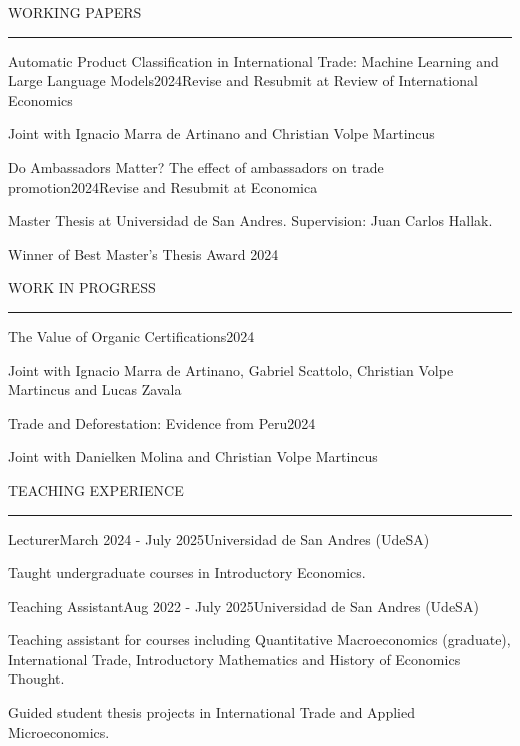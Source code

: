 \documentclass{resume} %
\renewenvironment{rSection}[1]{
\sectionskip
\textcolor{CustomRed}{\MakeUppercase{#1}}
\sectionlineskip
\hrule
\begin{list}{}{
\setlength{\leftmargin}{1.5em}
}
\item[]
}{
\end{list}
}
\begin{document}
\vspace{-0.3cm}
\begin{rSection}{Working Papers}
\begin{rSubsection}{Automatic Product Classification in International Trade: Machine Learning and Large Language Models}{2024}{Revise and Resubmit at Review of International Economics}{}
\item{Joint with Ignacio Marra de Artinano and Christian Volpe Martincus}
\end{rSubsection}

\begin{rSubsection}{Do Ambassadors Matter? The effect of ambassadors on trade promotion}{2024}{Revise and Resubmit at Economica}{}
\item{Master Thesis at Universidad de San Andres. Supervision: Juan Carlos Hallak.}
\item{Winner of Best Master's Thesis Award 2024}
\end{rSubsection}
\end{rSection}

\vspace{-0.3cm}
\begin{rSection}{Work in Progress}
\begin{rSubsection}{The Value of Organic Certifications}{2024}{}{}
\item{Joint with Ignacio Marra de Artinano, Gabriel Scattolo, Christian Volpe Martincus and Lucas Zavala}
\end{rSubsection}

\begin{rSubsection}{Trade and Deforestation: Evidence from Peru}{2024}{}{}
\item{Joint with Danielken Molina and Christian Volpe Martincus}
\end{rSubsection}
\end{rSection}

\vspace{-0.3cm}
\begin{rSection}{Teaching Experience}
\begin{rSubsection}{Lecturer}{March 2024 - July 2025}{Universidad de San Andres (UdeSA)}{}
\item Taught undergraduate courses in Introductory Economics.
\end{rSubsection}
\begin{rSubsection}{Teaching Assistant}{Aug 2022 - July 2025}{Universidad de San Andres (UdeSA)}{}
\item{Teaching assistant for courses including Quantitative Macroeconomics (graduate), International Trade, Introductory Mathematics and History of Economics Thought.}
\item{Guided student thesis projects in International Trade and Applied Microeconomics.}
\end{rSubsection}
\end{rSection}
\end{document}

